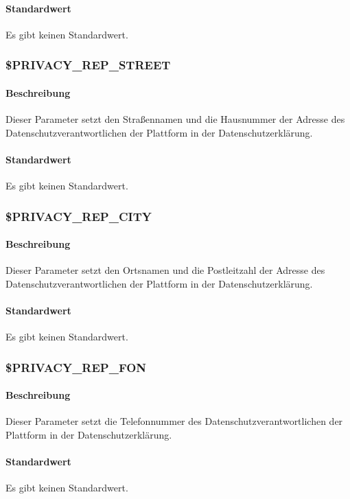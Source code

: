 \paragraph{Standardwert}Es gibt keinen Standardwert.

\subsubsection{\$PRIVACY\_REP\_STREET} \label{config:privacy-rep-street}
\paragraph{Beschreibung}Dieser Parameter setzt den Straßennamen und die Hausnummer der Adresse des Datenschutzverantwortlichen der Plattform in der Datenschutzerklärung.
\paragraph{Standardwert}Es gibt keinen Standardwert.

\subsubsection{\$PRIVACY\_REP\_CITY} \label{config:privacy-rep-city}
\paragraph{Beschreibung}Dieser Parameter setzt den Ortsnamen und die Postleitzahl der Adresse des Datenschutzverantwortlichen der Plattform in der Datenschutzerklärung.
\paragraph{Standardwert}Es gibt keinen Standardwert.

\subsubsection{\$PRIVACY\_REP\_FON} \label{config:privacy-rep-fon}
\paragraph{Beschreibung}Dieser Parameter setzt die Telefonnummer des Datenschutzverantwortlichen der Plattform in der Datenschutzerklärung.
\paragraph{Standardwert}Es gibt keinen Standardwert.

